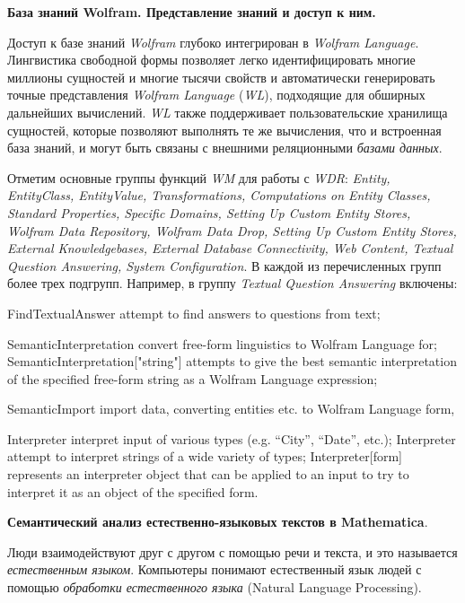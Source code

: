 \textbf{База знаний Wolfram. Представление знаний и доступ к ним.}

Доступ к базе знаний \textit{Wolfram} глубоко интегрирован в \textit{Wolfram Language}. Лингвистика свободной формы позволяет легко идентифицировать многие миллионы сущностей и многие тысячи свойств и автоматически генерировать точные представления \textit{Wolfram Language} (\textit{WL}), подходящие для обширных дальнейших вычислений. \textit{WL} также поддерживает пользовательские хранилища сущностей, которые позволяют выполнять те же вычисления, что и встроенная база знаний, и могут быть связаны с внешними реляционными \textit{базами данных}. 

Отметим основные группы функций \textit{WM} для работы с \textit{WDR}: 
\textit{Entity, EntityClass, EntityValue, Transformations, Computations on Entity Classes, Standard Properties, Specific Domains, Setting Up Custom Entity Stores, Wolfram Data Repository, Wolfram Data Drop, Setting Up Custom Entity Stores, External Knowledgebases, External Database Connectivity, Web Content, Textual Question Answering, System Configuration}. 
В каждой из перечисленных групп более трех подгрупп. Например, в группу \textit{Textual Question Answering} включены: 
\begin{textitemize}
	\item FindTextualAnswer attempt to find answers to questions from text;
	\item SemanticInterpretation convert free-form linguistics to Wolfram Language for; SemanticInterpretation["string"] attempts to give the best semantic interpretation of the specified free-form string as a Wolfram Language expression; 
	\item SemanticImport import data, converting entities etc. to Wolfram Language form, 
	\item Interpreter interpret input of various types (e.g. ``City'', ``Date'', etc.); Interpreter attempt to interpret strings of a wide variety of types; Interpreter[form] represents an interpreter object that can be applied to an input to try to interpret it as an object of the specified form.
\end{textitemize}

\textbf{Семантический анализ естественно-языковых текстов в Mathematica}. 

Люди взаимодействуют друг с другом с помощью речи и текста, и это называется \textit{естественным языком}. Компьютеры понимают естественный язык людей с помощью \textit{обработки естественного языка} (Natural Language Processing).

